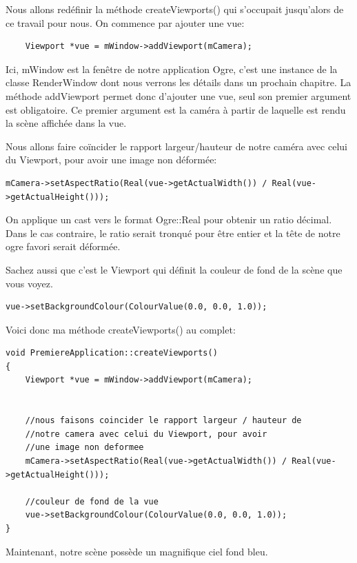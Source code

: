 Nous allons redéfinir la méthode createViewports() qui s'occupait jusqu'alors de ce travail pour nous. On commence par ajouter une vue:

\begin{lstlisting}
	Viewport *vue = mWindow->addViewport(mCamera);
\end{lstlisting}

Ici, mWindow est la fenêtre de notre application Ogre, c'est une instance de la classe RenderWindow dont nous verrons les détails dans un prochain chapitre. La méthode addViewport permet donc d'ajouter une vue, seul son premier argument est obligatoire. Ce premier argument est la caméra à partir de laquelle est rendu la scène affichée dans la vue.

Nous allons faire co\"incider le rapport largeur/hauteur de notre caméra avec celui du Viewport, pour avoir une image non déformée:
\begin{lstlisting}
mCamera->setAspectRatio(Real(vue->getActualWidth()) / Real(vue->getActualHeight()));
\end{lstlisting}

On applique un cast vers le format Ogre::Real pour obtenir un ratio décimal. Dans le cas contraire, le ratio serait tronqué pour être entier et la tête de notre ogre favori serait déformée.

Sachez aussi que c'est le Viewport qui définit la couleur de fond de la scène que vous voyez. 
\begin{lstlisting}
vue->setBackgroundColour(ColourValue(0.0, 0.0, 1.0));
\end{lstlisting}

Voici donc ma méthode createViewports() au complet:
\begin{lstlisting}[caption={Création d'un viewport}]
void PremiereApplication::createViewports()
{
    Viewport *vue = mWindow->addViewport(mCamera);
    
    
    //nous faisons coincider le rapport largeur / hauteur de 
    //notre camera avec celui du Viewport, pour avoir 
    //une image non deformee
    mCamera->setAspectRatio(Real(vue->getActualWidth()) / Real(vue->getActualHeight()));
    
    //couleur de fond de la vue
    vue->setBackgroundColour(ColourValue(0.0, 0.0, 1.0));
}
\end{lstlisting}


Maintenant, notre scène possède un magnifique ciel fond bleu.









